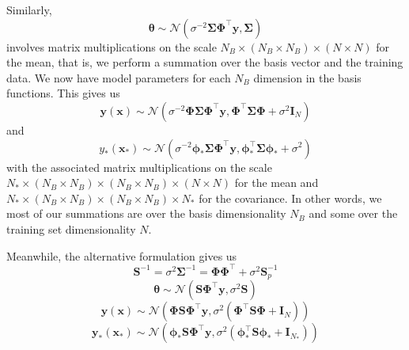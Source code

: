 \documentclass{article}
\begin{document}
Similarly,
\begin{equation}
\label{theta_distribution}
    \boldsymbol{\theta}\sim\mathcal{N}( \sigma^{-2}\boldsymbol{\Sigma} \boldsymbol{\Phi}^\top \mathbf{y},\boldsymbol{\Sigma})
\end{equation} 
involves matrix multiplications on the scale $N_B \times (N_B \times N_B) \times (N \times N)$ for the mean, that is, we perform a summation over the basis vector and the training data. We now have model parameters for each $N_B$ dimension in the basis functions. This gives us
\begin{equation}
\label{BLR_posterior}
    \mathbf{y}(\mathbf{x})\sim\mathcal{N}\left(\sigma^{-2}\boldsymbol{\Phi}  \boldsymbol{\Sigma} \boldsymbol{\Phi}^\top\mathbf{y} ,\boldsymbol{\Phi}^\top\boldsymbol{\Sigma}\boldsymbol{\Phi}+\sigma^2 \mathbf{I}_N\right)
\end{equation} 
and
\begin{equation}
\label{BLR_posterior}
    y_\ast(\mathbf{x}_\ast)\sim\mathcal{N}\left(\sigma^{-2}\boldsymbol{\phi}_\ast  \boldsymbol{\Sigma} \boldsymbol{\Phi}^\top\mathbf{y} ,\boldsymbol{\phi}^\top_\ast \boldsymbol{\Sigma}\boldsymbol{\phi}_\ast+ \sigma^2\right)
\end{equation} 
with the associated matrix multiplications on the scale $N_\ast \times(N_B \times N_B) \times (N_B \times N_B) \times (N \times N)$ for the mean and $N_\ast \times (N_B \times N_B) \times (N_B \times N_B) \times N_\ast$ for the covariance. In other words, we most of our summations are over the basis dimensionality $N_B$ and some over the training set dimensionality $N$.

Meanwhile, the alternative formulation gives us 
\begin{equation}
\label{eq:define_S}
    \mathbf{S}^{-1} = \sigma^2\boldsymbol{\Sigma}^{-1}=\boldsymbol{\Phi \Phi}^\top + \sigma^2\mathbf{S}_p^{-1}
\end{equation}
\begin{equation}
\label{theta_distribution}
    \boldsymbol{\theta}\sim\mathcal{N}( \mathbf{S} \boldsymbol{\Phi}^\top \mathbf{y},\sigma^2\mathbf{S})
\end{equation} 
\begin{equation}
\label{BLR_posterior}
    \mathbf{y}(\mathbf{x})\sim\mathcal{N}\left(\boldsymbol{\Phi}  \mathbf{S} \boldsymbol{\Phi}^\top\mathbf{y} ,\sigma^2\left(\boldsymbol{\Phi}^\top\mathbf{S}\boldsymbol{\Phi}+\mathbf{I}_N\right)\right)
\end{equation} 
\begin{equation}
\label{BLR_posterior}
    \mathbf{y_\ast}(\mathbf{x}_\ast)\sim\mathcal{N}\left(\boldsymbol{\phi}_\ast  \mathbf{S} \boldsymbol{\Phi}^\top\mathbf{y} ,\sigma^2\left(\boldsymbol{\phi}^\top_\ast \mathbf{S}\boldsymbol{\phi}_\ast+ \mathbf{I}_{N_\ast}\right)\right)
\end{equation} 
\end{document}
